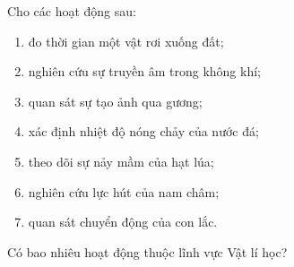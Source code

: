 \documentclass[Main.tex]{subfiles}
\begin{document}
	\begin{ex}
		Cho các hoạt động sau:
		\begin{enumerate}[(1)]
			\item đo thời gian một vật rơi xuống đất;
			\item nghiên cứu sự truyền âm trong không khí;
			\item quan sát sự tạo ảnh qua gương;
			\item xác định nhiệt độ nóng chảy của nước đá;
			\item theo dõi sự nảy mầm của hạt lúa;
			\item nghiên cứu lực hút của nam châm;
			\item quan sát chuyển động của con lắc.
		\end{enumerate}
		Có bao nhiêu hoạt động thuộc lĩnh vực Vật lí học?
	\end{ex}
\end{document}
